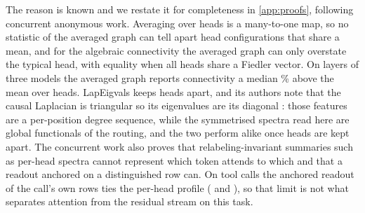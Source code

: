 The reason is known and we restate it for completeness in \cref{app:proofs}, following concurrent anonymous work. Averaging over heads is a many-to-one map, so no statistic of the averaged graph can tell apart head configurations that share a mean, and for the algebraic connectivity the averaged graph can only overstate the typical head, with equality when all heads share a Fiedler vector. On \jensenLayers{} layers of three models the averaged graph reports connectivity a median \jensenRatioMedianPct{}\% above the mean over heads. LapEigvals keeps heads apart, and its authors note that the causal Laplacian is triangular so its eigenvalues are its diagonal \citep{binkowski2025lapeigvals}: those features are a per-position degree sequence, while the symmetrised spectra read here are global functionals of the routing, and the two perform alike once heads are kept apart. The concurrent work also proves that relabeling-invariant summaries such as per-head spectra cannot represent which token attends to which and that a readout anchored on a distinguished row can. On tool calls the anchored readout of the call's own rows ties the per-head profile (\GapAnchPerHeadLlamaOneBBfcl{} and \GapAnchPerHeadGemmaBfcl{}), so that limit is not what separates attention from the residual stream on this task.
